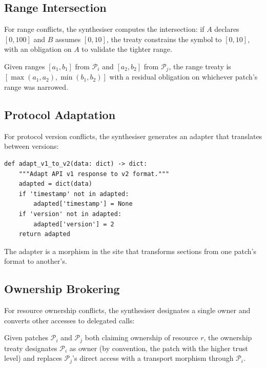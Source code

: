\documentclass[11pt]{article}
\newcommand{\patch}{\mathcal{P}}
\begin{document}
\subsection{Range Intersection}

For range conflicts, the synthesiser computes the intersection:
if $A$ declares $[0, 100]$ and $B$ assumes $[0, 10]$, the treaty
constrains the symbol to $[0, 10]$, with an obligation on $A$ to
validate the tighter range.

\begin{definition}\label{def:range-treaty}
Given ranges $[a_1, b_1]$ from $\patch_i$ and $[a_2, b_2]$ from
$\patch_j$, the range treaty is
$[\max(a_1, a_2), \min(b_1, b_2)]$ with a residual obligation on
whichever patch's range was narrowed.
\end{definition}

\subsection{Protocol Adaptation}

For protocol version conflicts, the synthesiser generates an adapter
that translates between versions:

\begin{lstlisting}[style=jugeo-python,caption={Protocol adapter generation.}]
def adapt_v1_to_v2(data: dict) -> dict:
    """Adapt API v1 response to v2 format."""
    adapted = dict(data)
    if 'timestamp' not in adapted:
        adapted['timestamp'] = None
    if 'version' not in adapted:
        adapted['version'] = 2
    return adapted
\end{lstlisting}

The adapter is a morphism in the site that transforms sections from
one patch's format to another's.

\subsection{Ownership Brokering}

For resource ownership conflicts, the synthesiser designates a
single owner and converts other accesses to delegated calls:

\begin{definition}\label{def:ownership}
Given patches $\patch_i$ and $\patch_j$ both claiming ownership of
resource $r$, the ownership treaty designates $\patch_i$ as owner
(by convention, the patch with the higher trust level) and replaces
$\patch_j$'s direct access with a transport morphism through
$\patch_i$.
\end{definition}
\end{document}
